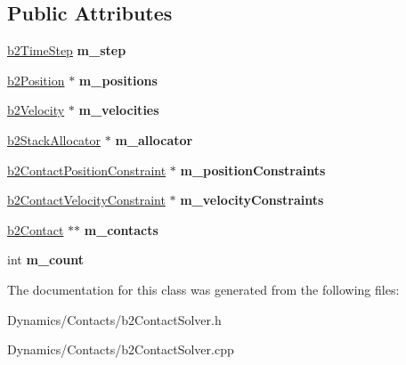 \subsection*{Public Attributes}
\begin{DoxyCompactItemize}
\item 
\mbox{\label{classb2ContactSolver_aac78600ba5fd3249bac20678cbc9f101}} 
\mbox{\hyperlink{structb2TimeStep}{b2\+Time\+Step}} {\bfseries m\+\_\+step}
\item 
\mbox{\label{classb2ContactSolver_a39b973c8311e522f44cda9053dcea5a8}} 
\mbox{\hyperlink{structb2Position}{b2\+Position}} $\ast$ {\bfseries m\+\_\+positions}
\item 
\mbox{\label{classb2ContactSolver_aae6dae9341dbbd780e7b3ec6b1b332f9}} 
\mbox{\hyperlink{structb2Velocity}{b2\+Velocity}} $\ast$ {\bfseries m\+\_\+velocities}
\item 
\mbox{\label{classb2ContactSolver_a6a2c9f5470a469e50d7f33f8d9095abe}} 
\mbox{\hyperlink{classb2StackAllocator}{b2\+Stack\+Allocator}} $\ast$ {\bfseries m\+\_\+allocator}
\item 
\mbox{\label{classb2ContactSolver_ac0f4106f7cf67d185a7a4f3fd5a4e4ce}} 
\mbox{\hyperlink{structb2ContactPositionConstraint}{b2\+Contact\+Position\+Constraint}} $\ast$ {\bfseries m\+\_\+position\+Constraints}
\item 
\mbox{\label{classb2ContactSolver_a616319ffa7ceb509b8189f07a070f7c7}} 
\mbox{\hyperlink{structb2ContactVelocityConstraint}{b2\+Contact\+Velocity\+Constraint}} $\ast$ {\bfseries m\+\_\+velocity\+Constraints}
\item 
\mbox{\label{classb2ContactSolver_aa1c7370d1d2681f9d49a494f9b0a38c6}} 
\mbox{\hyperlink{classb2Contact}{b2\+Contact}} $\ast$$\ast$ {\bfseries m\+\_\+contacts}
\item 
\mbox{\label{classb2ContactSolver_ab5b74c0fadf0d5d8997700b5ff91ea91}} 
int {\bfseries m\+\_\+count}
\end{DoxyCompactItemize}


The documentation for this class was generated from the following files\+:\begin{DoxyCompactItemize}
\item 
Dynamics/\+Contacts/b2\+Contact\+Solver.\+h\item 
Dynamics/\+Contacts/b2\+Contact\+Solver.\+cpp\end{DoxyCompactItemize}

